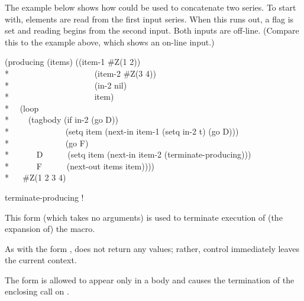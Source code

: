 \begin{defmac}
The example below shows how  could be used to
concatenate two series.  To start with, elements are read from the
first input series.  When this runs out, a flag is set and reading
begins from the second input.  Both inputs are off-line.
(Compare this to the example
above, which shows an on-line input.)
\begin{lisp}
(producing (items) ((item-1 \#Z(1 2)) \\*
~~~~~~~~~~~~~~~~~~~~(item-2 \#Z(3 4)) \\*
~~~~~~~~~~~~~~~~~~~~(in-2 nil) \\*
~~~~~~~~~~~~~~~~~~~~item) \\*
~~(loop \\*
~~~~(tagbody (if in-2 (go D)) \\*
~~~~~~~~~~~~~(setq item (next-in item-1 (setq in-2 t) (go D))) \\*
~~~~~~~~~~~~~(go F) \\*
~~~~~~D~~~~~~(setq item (next-in item-2 (terminate-producing))) \\*
~~~~~~F~~~~~~(next-out items item)))) \\*
~~{\EV} \#Z(1 2 3 4)
\end{lisp}
\end{defmac}

\begin{defmac}
terminate-producing \!!

This form (which takes no arguments) is used to terminate execution of
(the expansion of) the  macro.

As with the form ,
 does not return any values; rather, control
immediately leaves the current context.

The form 
is allowed to appear only in a  body and causes the
termination of the enclosing call on .
\end{defmac}

